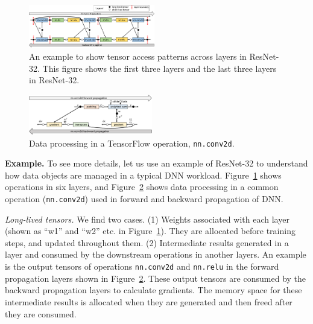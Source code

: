 


\begin{figure}
\centering
\includegraphics[width=0.49\textwidth]{figures/tensor_usage.pdf}
\vspace{-20pt}
\caption{\textcolor{check}{An example to show tensor access patterns across layers in ResNet-32. This figure shows the first three layers and the last three layers in ResNet-32}.}
\vspace{-10pt}
\label{fig:tensor_usage}
\end{figure}
\begin{figure}
\centering
\includegraphics[width=0.48\textwidth]{figures/conv_tensor_usage.pdf}
\vspace{-20pt}
\caption{\textcolor{check}{Data processing in a TensorFlow operation, \texttt{nn.conv2d}.}}
\vspace{-10pt}
\label{fig:conv_tensor_usage}
\end{figure}


\textcolor{check}{
\textbf{Example.} %
\textcolor{check}{To see more details, let us use an example of ResNet-32 }
to understand how data objects are managed in a typical DNN workload. Figure~\ref{fig:tensor_usage} shows operations in six layers, and Figure~\ref{fig:conv_tensor_usage} shows data processing in a common operation (\texttt{nn.conv2d}) used in forward and backward propagation of DNN. }

\textcolor{check}{\textit{Long-lived tensors.} We find two cases. (1) Weights associated with each layer (shown as ``w1'' and ``w2'' etc. in Figure~\ref{fig:tensor_usage}). They are allocated before training steps, and updated throughout them.  (2) Intermediate results generated in a layer and consumed by the downstream operations in another layers. An example is the output tensors of operations \texttt{nn.conv2d} and \texttt{nn.relu} in the forward propagation layers shown in Figure~\ref{fig:conv_tensor_usage}. These output tensors are consumed %
\textcolor{check}{by the backward propagation layers to calculate gradients.}
The memory space for these intermediate results is allocated when they are generated and then freed after they are consumed.}


